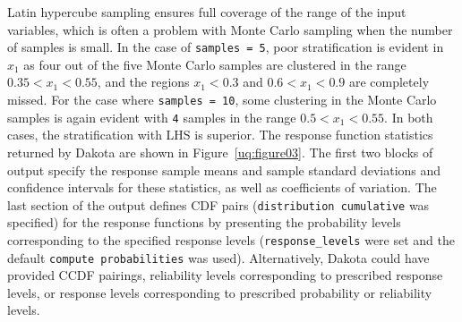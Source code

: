 Latin hypercube sampling ensures full coverage of the range of the
input variables, which is often a problem with Monte Carlo sampling
when the number of samples is small. In the case of \texttt{samples =
5}, poor stratification is evident in $x_1$ as four out of the five
Monte Carlo samples are clustered in the range $0.35 < x_1 < 0.55$,
and the regions $x_1 < 0.3$ and $0.6 < x_1 < 0.9$ are completely
missed. For the case where \texttt{samples = 10}, some clustering in
the Monte Carlo samples is again evident with \texttt{4} samples in
the range $0.5 < x_1 < 0.55$. In both cases, the stratification with
LHS is superior. The response function statistics returned by Dakota
are shown in Figure~\ref{uq:figure03}. The first two blocks of output
specify the response sample means and sample standard deviations and
confidence intervals for these statistics, as well as coefficients of
variation. The last section of the output defines CDF pairs
(\texttt{distribution cumulative} was specified) for the response
functions by presenting the probability levels corresponding to the
specified response levels (\texttt{response\_levels} were set and the
default \texttt{compute probabilities} was used). Alternatively,
Dakota could have provided CCDF pairings, reliability levels
corresponding to prescribed response levels, or response levels
corresponding to prescribed probability or reliability levels.

